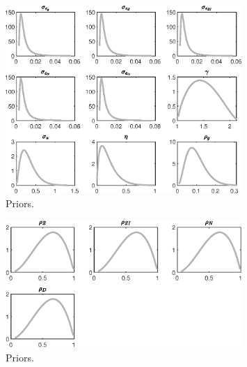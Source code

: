 
\begin{figure}[H]
\centering
\includegraphics[width=0.80\textwidth]{BRS_growth_util/graphs/BRS_growth_util_Priors1}
\caption{Priors.}\label{Fig:Priors:1}
\end{figure}
\begin{figure}[H]
\centering
\includegraphics[width=0.80\textwidth]{BRS_growth_util/graphs/BRS_growth_util_Priors2}
\caption{Priors.}\label{Fig:Priors:2}
\end{figure}
 
